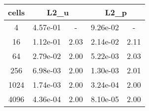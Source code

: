 \documentclass[10pt]{report}
\begin{document}
\begin{table}[H]
\begin{center}
\begin{tabular}{|c|c|c|c|c|} \hline
cells & 
\multicolumn{2}{|c|}{L2_u} & 
\multicolumn{2}{|c|}{L2_p}\\ \hline
4 & 4.57e-01 & - & 9.26e-02 & -\\ \hline
16 & 1.12e-01 & 2.03 & 2.14e-02 & 2.11\\ \hline
64 & 2.79e-02 & 2.00 & 5.22e-03 & 2.03\\ \hline
256 & 6.98e-03 & 2.00 & 1.30e-03 & 2.01\\ \hline
1024 & 1.74e-03 & 2.00 & 3.24e-04 & 2.00\\ \hline
4096 & 4.36e-04 & 2.00 & 8.10e-05 & 2.00\\ \hline
\end{tabular}
\end{center}
\end{table}
\end{document}

